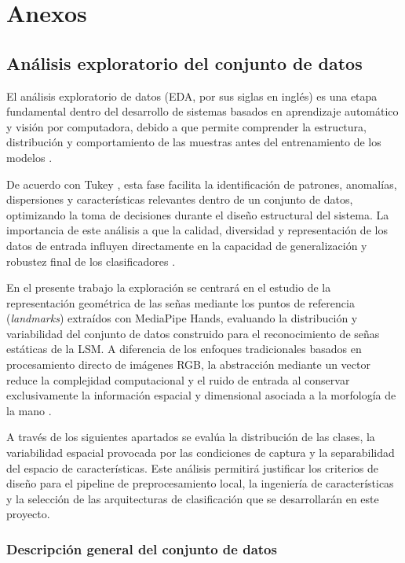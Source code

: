 	\chapter{Anexos}
	
	\section{Análisis exploratorio del conjunto de datos}
	
	El análisis exploratorio de datos (EDA, por sus siglas en inglés) es una etapa fundamental dentro del desarrollo de sistemas basados en aprendizaje automático y visión por computadora, debido a que permite comprender la estructura, distribución y comportamiento de las muestras antes del entrenamiento de los modelos \cite{tukey1977eda,geron2022hands}. 
	
	De acuerdo con Tukey \cite{tukey1977eda}, esta fase facilita la identificación de patrones, anomalías, dispersiones y características relevantes dentro de un conjunto de datos, optimizando la toma de decisiones durante el diseño estructural del sistema. La importancia de este análisis a que la calidad, diversidad y representación de los datos de entrada influyen directamente en la capacidad de generalización y robustez final de los clasificadores \cite{goodfellow2016deep}.
	
	En el presente trabajo la exploración se centrará en el estudio de la representación geométrica de las señas mediante los puntos de referencia (\textit{landmarks}) extraídos con MediaPipe Hands, evaluando la distribución y variabilidad del conjunto de datos construido para el reconocimiento de señas estáticas de la LSM. A diferencia de los enfoques tradicionales basados en procesamiento directo de imágenes RGB, la abstracción mediante un vector reduce  la complejidad computacional y el ruido de entrada al conservar exclusivamente la información espacial y dimensional asociada a la morfología de la mano \cite{mediapipe_hands}.
	
	A través de los siguientes apartados se evalúa la distribución de las clases, la variabilidad espacial provocada por las condiciones de captura y la separabilidad del espacio de características. Este análisis permitirá justificar los criterios de diseño para el pipeline de preprocesamiento local, la ingeniería de características y la selección de las arquitecturas de clasificación que se desarrollarán en este proyecto.
	
	\subsection{Descripción general del conjunto de datos}
	
